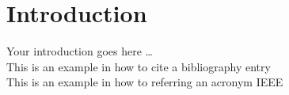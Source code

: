 

\section{Introduction}
\label{sec:introduction}
Your introduction goes here \ldots \\

This is an example in how to cite a bibliography entry \cite{cui2019} \\

This is an example in how to referring an acronym \gls{IEEE}
